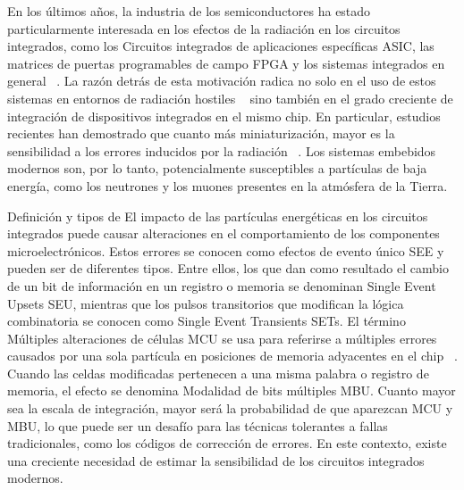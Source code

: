 En los últimos años, la industria de los semiconductores ha estado particularmente interesada en los efectos de la radiación en los circuitos integrados, como los Circuitos integrados de aplicaciones específicas ASIC, las matrices de puertas programables de campo FPGA y los sistemas integrados en general ~\cite{Velazco2007}.
La razón detrás de esta motivación radica no solo en el uso de estos sistemas en entornos de radiación hostiles ~\cite{Dixit2011} sino también en el grado creciente de integración de dispositivos integrados en el mismo chip.
En particular, estudios recientes han demostrado que cuanto más miniaturización, mayor es la sensibilidad a los errores inducidos por la radiación ~\cite{Ibe2010}.
Los sistemas embebidos modernos son, por lo tanto, potencialmente susceptibles a partículas de baja energía, como los neutrones y los muones presentes en la atmósfera de la Tierra.

Definición y tipos de%
El impacto de las partículas energéticas en los circuitos integrados puede causar alteraciones en el comportamiento de los componentes microelectrónicos.
Estos errores se conocen como efectos de evento único SEE y pueden ser de diferentes tipos.
Entre ellos, los que dan como resultado el cambio de un bit de información en un registro o memoria se denominan Single Event Upsets SEU, mientras que los pulsos transitorios que modifican la lógica combinatoria se conocen como Single Event Transients SETs.
El término Múltiples alteraciones de células MCU se usa para referirse a múltiples errores causados por una sola partícula en posiciones de memoria adyacentes en el chip ~\cite{Quinn2007}.
Cuando las celdas modificadas pertenecen a una misma palabra o registro de memoria, el efecto se denomina Modalidad de bits múltiples MBU.
Cuanto mayor sea la escala de integración, mayor será la probabilidad de que aparezcan MCU y MBU, lo que puede ser un desafío para las técnicas tolerantes a fallas tradicionales, como los códigos de corrección de errores.
En este contexto, existe una creciente necesidad de estimar la sensibilidad de los circuitos integrados modernos.


